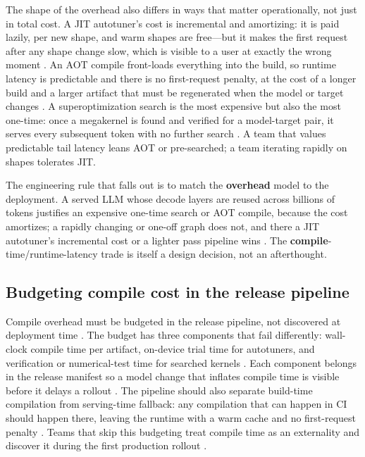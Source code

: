 The shape of the overhead also differs in ways that matter operationally, not just in total cost. A JIT autotuner's cost is incremental and amortizing: it is paid lazily, per new shape, and warm shapes are free---but it makes the first request after any shape change slow, which is visible to a user at exactly the wrong moment \citep{tritonlang2024,kwon2023vllm}. An AOT compile front-loads everything into the build, so runtime latency is predictable and there is no first-request penalty, at the cost of a longer build and a larger artifact that must be regenerated when the model or target changes \citep{iree2024,rotem2018glow}. A superoptimization search is the most expensive but also the most one-time: once a megakernel is found and verified for a model-target pair, it serves every subsequent token with no further search \citep{wu2024mirage,mpk2025}. A team that values predictable tail latency leans AOT or pre-searched; a team iterating rapidly on shapes tolerates JIT.

The engineering rule that falls out is to match the \textbf{overhead} model to the deployment. A served LLM whose decode layers are reused across billions of tokens justifies an expensive one-time search or AOT compile, because the cost amortizes; a rapidly changing or one-off graph does not, and there a JIT autotuner's incremental cost or a lighter pass pipeline wins \citep{kwon2023vllm,patel2025llminference}. The \textbf{compile}-time/runtime-latency trade is itself a design decision, not an afterthought.

\subsection{Budgeting compile cost in the release pipeline}

Compile overhead must be budgeted in the release pipeline, not discovered at deployment time \citep{chen2020compilerbasedhardw,memoryfloor2026}. The budget has three components that fail differently: wall-clock compile time per artifact, on-device trial time for autotuners, and verification or numerical-test time for searched kernels \citep{zheng2020ansor,wu2024mirage,patel2025llminference}. Each component belongs in the release manifest so a model change that inflates compile time is visible before it delays a rollout \citep{chen2020compilerbasedhardw,taxbreak2026}. The pipeline should also separate build-time compilation from serving-time fallback: any compilation that can happen in CI should happen there, leaving the runtime with a warm cache and no first-request penalty \citep{tritonlang2024,kwon2023vllm}. Teams that skip this budgeting treat compile time as an externality and discover it during the first production rollout \citep{memoryfloor2026,patel2025llminference}.

